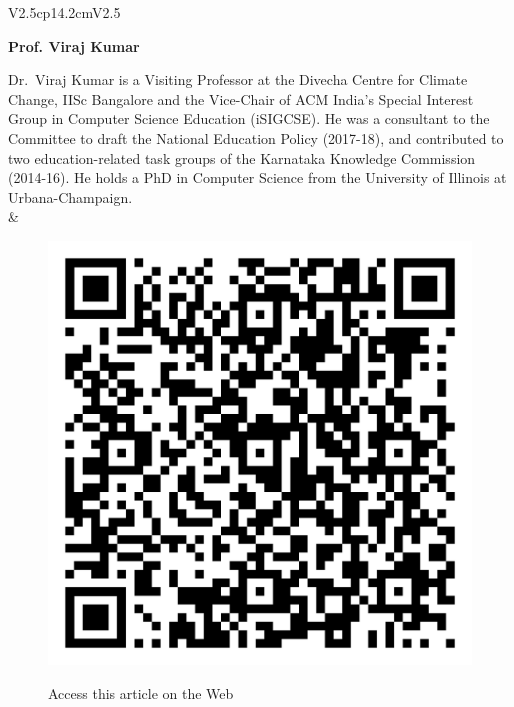 \begin{tabular}{V{2.5}cp{14.2cm}V{2.5}}
\centerline{\large\bf Prof. Viraj Kumar}

\bigskip
Dr.~Viraj Kumar is a Visiting Professor at the Divecha Centre for Climate Change, IISc Bangalore and the Vice-Chair of ACM India’s Special Interest Group in Computer Science Education (iSIGCSE). He was a consultant to the Committee to draft the National Education Policy (2017-18), and contributed to two education-related task groups of the Karnataka Knowledge Commission (2014-16). He holds a PhD in Computer Science from the University of Illinois at Urbana-Champaign.\\
&\\
\end{tabular}

\vskip 1cm

\begin{figure}[H]
\centering
\includegraphics[scale=.15]{src/Figures/QR-codes/qr-code_experiential-learning.png}

\medskip

{\large\sf Access this article on the Web}
\end{figure}

